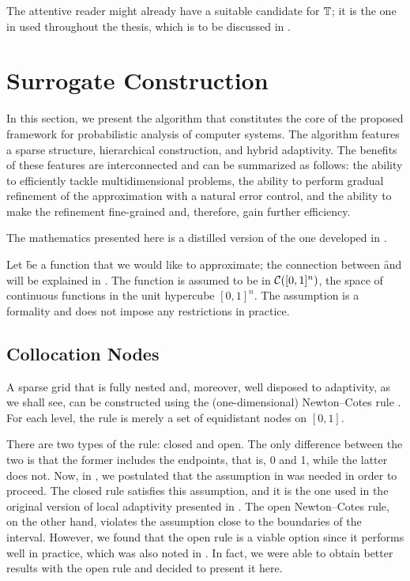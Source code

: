 The attentive reader might already have a suitable candidate for $\transform$;
it is the one in  used throughout the thesis,
which is to be discussed in .

\section{Surrogate Construction}

In this section, we present the algorithm that constitutes the core of the
proposed framework for probabilistic analysis of computer systems. The algorithm
features a sparse structure, hierarchical construction, and hybrid adaptivity.
The benefits of these features are interconnected and can be summarized as
follows: the ability to efficiently tackle multidimensional problems, the
ability to perform gradual refinement of the approximation with a natural error
control, and the ability to make the refinement fine-grained and, therefore,
gain further efficiency.

The mathematics presented here is a distilled version of the one developed in
\cite{klimke2006, ma2009, jakeman2012}.

Let \f be a function that we would like to approximate; the connection between
\f and \g will be explained in . The function is assumed to be in
$\mathcal{C}([0, 1]^n)$, the space of continuous functions in the unit hypercube
$[0, 1]^n$. The assumption is a formality and does not impose any restrictions
in practice.

\subsection{Collocation Nodes}

A sparse grid that is fully nested and, moreover, well disposed to adaptivity,
as we shall see, can be constructed using the (one-dimensional) Newton--Cotes
rule \cite{ma2009}. For each level, the rule is merely a set of equidistant
nodes on $[0, 1]$.

There are two types of the rule: closed and open. The only difference between
the two is that the former includes the endpoints, that is, 0 and 1, while the
latter does not. Now, in , we postulated that the assumption in
 was needed in order to proceed. The closed rule
satisfies this assumption, and it is the one used in the original version of
local adaptivity presented in \cite{ma2009}. The open Newton--Cotes rule, on the
other hand, violates the assumption close to the boundaries of the interval.
However, we found that the open rule is a viable option since it performs well
in practice, which was also noted in \cite{klimke2006}. In fact, we were able to
obtain better results with the open rule and decided to present it here.

